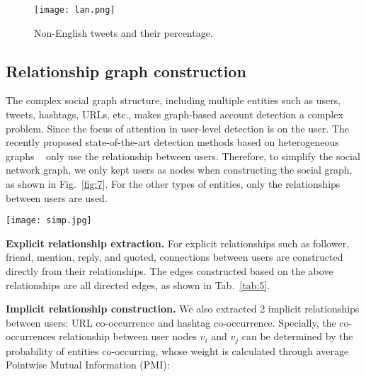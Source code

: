 \documentclass[10pt,twocolumn,letterpaper]{article}
\begin{document}
\begin{figure}[h]
  \centering
   \texttt{[image: lan.png]}
     \vspace{-0.2cm}
   \caption{Non-English tweets and their percentage.}
     \vspace{-0.2cm}
   \label{fig:5}
\end{figure}



\subsection{Relationship graph construction}
The complex social graph structure, including multiple entities such as users, tweets, hashtags, URLs, etc., makes graph-based account detection a complex problem. Since the focus of attention in user-level detection is on the user. The recently proposed state-of-the-art detection methods based on heterogeneous graphs ~\cite{Alpher06,Alpher44,Alpher45,Alpher46} only use the relationship between users. Therefore, to simplify the social network graph, we only kept users as nodes when constructing the social graph, as shown in Fig.~\ref{fig:7}. For the other types of entities, only the relationships between users are used.

\begin{figure*}[ht]
  \centering
   \texttt{[image: simp.jpg]}
     \vspace{-0.2cm}
   \caption{We simplify the original complex heterogeneous graph network (left) and construct a user-level multi-graph network (right). Black, red, and green denote neutral, against, and support.}
     \vspace{-0.2cm}
   \label{fig:7}
\end{figure*}

\noindent
\textbf{Explicit relationship extraction.}
For explicit relationships such as follower, friend, mention, reply, and quoted, connections between users are constructed directly from their relationships. The edges constructed based on the above relationships are all directed edges, as shown in Tab.~\ref{tab:5}.

\noindent
\textbf{Implicit relationship construction.}
We also extracted 2 implicit relationships between users: URL co-occurrence and hashtag co-occurrence. Specially, the co-occurrences relationship between user nodes ${v}_{i}$ and ${v}_{j}$ can be determined by the probability of entities co-occurring, whose weight is calculated through average Pointwise Mutual Information (PMI):
\end{document}
